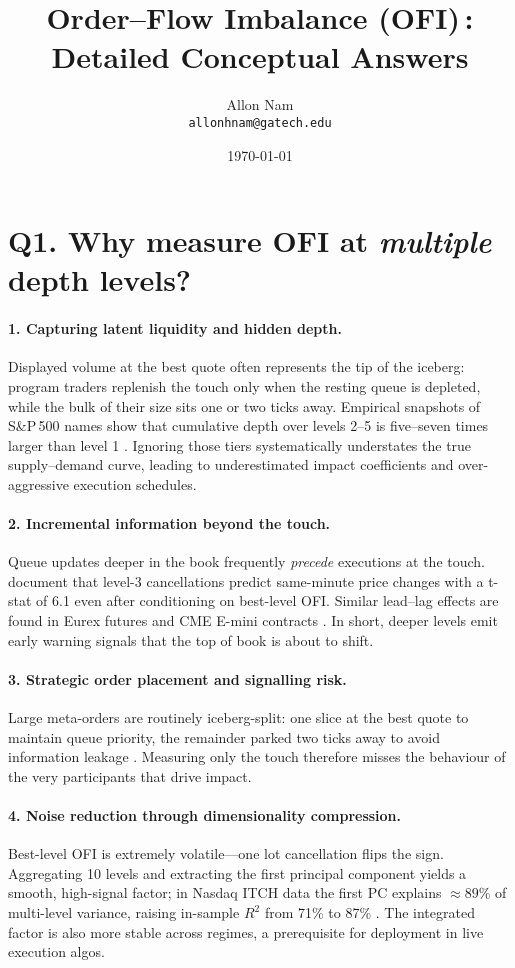 \documentclass[11pt]{article}
\title{\vspace{-1.5cm}Order--Flow Imbalance (OFI)\,: Detailed Conceptual Answers}
\author{Allon Nam \\ \texttt{allonhnam@gatech.edu}}
\date{\today}
\begin{document}
\maketitle

\section*{Q1. Why measure OFI at \textit{multiple} depth levels?}

\paragraph{1. Capturing latent liquidity and hidden depth.}
Displayed volume at the best quote often represents the tip of the iceberg: program traders replenish the touch only when the resting queue is depleted, while the bulk of their size sits one or two ticks away.  Empirical snapshots of S\&P\,500 names show that cumulative depth over levels 2--5 is five--seven times larger than level 1 \citep{HarrisPanchapagesan2005, Xu2018}.  Ignoring those tiers systematically understates the true supply--demand curve, leading to underestimated impact coefficients and over-aggressive execution schedules.

\paragraph{2. Incremental information beyond the touch.}
Queue updates deeper in the book frequently \emph{precede} executions at the touch.  \citet{Cont2023} document that level-3 cancellations predict same-minute price changes with a t-stat of 6.1 even after conditioning on best-level OFI.  Similar lead–lag effects are found in Eurex futures \citep{Benzaquen2017} and CME E-mini contracts \citep{Donier2015}.  In short, deeper levels emit early warning signals that the top of book is about to shift.

\paragraph{3. Strategic order placement and signalling risk.}
Large meta-orders are routinely iceberg-split: one slice at the best quote to maintain queue priority, the remainder parked two ticks away to avoid information leakage \citep{BiaisWeill2006}.  Measuring only the touch therefore misses the behaviour of the very participants that drive impact.

\paragraph{4. Noise reduction through dimensionality compression.}
Best-level OFI is extremely volatile---one lot cancellation flips the sign.  Aggregating 10 levels and extracting the first principal component yields a smooth, high-signal factor; in Nasdaq ITCH data the first PC explains $\approx 89\%$ of multi-level variance, raising in-sample $R^{2}$ from 71\% to 87\% \citep{Kolm2023}.  The integrated factor is also more stable across regimes, a prerequisite for deployment in live execution algos.
\end{document}
